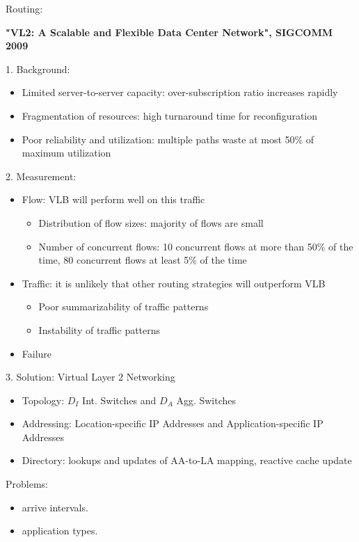 \documentclass[journal,onecolumn,11pt]{IEEEtran}
\begin{document}
Routing:


\textbf{"VL2: A Scalable and Flexible Data Center Network", SIGCOMM 2009}

1. Background:
\begin{itemize}
  \item Limited server-to-server capacity: over-subscription ratio increases rapidly
  \item Fragmentation of resources: high turnaround time for reconfiguration
  \item Poor reliability and utilization: multiple paths waste at most 50\% of maximum utilization
\end{itemize}

2. Measurement:
\begin{itemize}
  \item Flow: VLB will perform well on this traffic
  \begin{itemize}
    \item Distribution of flow sizes: majority of flows are small
    \item Number of concurrent flows: 10 concurrent flows at more than 50\% of the time, 80 concurrent flows at least 5\% of the time
  \end{itemize}
  \item Traffic: it is unlikely that other routing strategies will outperform VLB
  \begin{itemize}
    \item Poor summarizability of traffic patterns
    \item Instability of traffic patterns
  \end{itemize}
  \item Failure
\end{itemize}

3. Solution: Virtual Layer 2 Networking
\begin{itemize}
  \item Topology: $D_I$ Int. Switches and $D_A$ Agg. Switches
  \item Addressing: Location-specific IP Addresses and Application-specific IP Addresses
  \item Directory: lookups and updates of AA-to-LA mapping, reactive cache update
\end{itemize}

Problems:
\begin{itemize}
  \item arrive intervals.
  \item application types.
\end{itemize}
\end{document}
